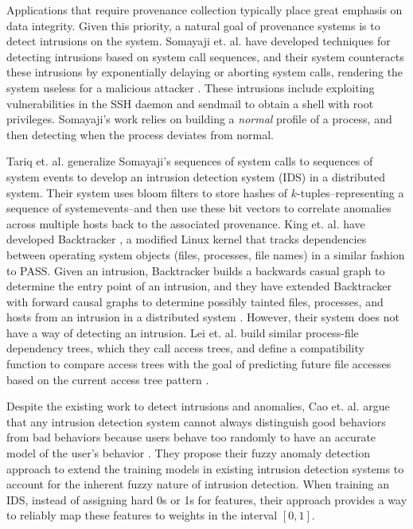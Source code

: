 \documentclass[10pt,twocolumn]{article}
\begin{document}
Applications that require provenance collection typically place great emphasis on data integrity. Given this priority, a natural goal of provenance systems is to detect intrusions on the system. Somayaji et. al. have developed techniques for detecting intrusions based on system call sequences, and their system counteracts these intrusions by exponentially delaying or aborting system calls, rendering the system useless for a malicious attacker \cite{somayaji}\cite{somayaji-recent}. These intrusions include exploiting vulnerabilities in the SSH daemon and sendmail to obtain a shell with root privileges. Somayaji's work relies on building a {\em normal} profile of a process, and then detecting when the process deviates from normal.

Tariq et. al. generalize Somayaji's sequences of system calls to sequences of system events \cite{correlated-anomalies} to develop an intrusion detection system (IDS) in a distributed system. Their system uses bloom filters to store hashes of $k$-tuples--representing a sequence of systemevents--and then use these bit vectors to correlate anomalies across multiple hosts back to the associated provenance. King et. al. have developed Backtracker \cite{backtracker}, a modified Linux kernel that tracks dependencies between operating system objects (files, processes, file names) in a similar fashion to PASS. Given an intrusion, Backtracker builds a backwards casual graph to determine the entry point of an intrusion, and they have extended Backtracker with forward causal graphs to determine possibly tainted files, processes, and hosts from an intrusion in a distributed system \cite{multihost}. However, their system does not have a way of detecting an intrusion. Lei et. al. build similar process-file dependency trees, which they call access trees, and define a compatibility function to compare access trees with the goal of predicting future file accesses based on the current access tree pattern \cite{fileprefetch}.

Despite the existing work to detect intrusions and anomalies, Cao et. al. argue that any intrusion detection system cannot always distinguish good behaviors from bad behaviors because users behave too randomly to have an accurate model of the user's behavior \cite{fuzzy}. They propose their fuzzy anomaly detection approach to extend the training models in existing intrusion detection systems to account for the inherent fuzzy nature of intrusion detection. When training an IDS, instead of assigning hard 0s or 1s for features, their approach provides a way to reliably map these features to weights in the interval $[0,1]$. 
\end{document}
